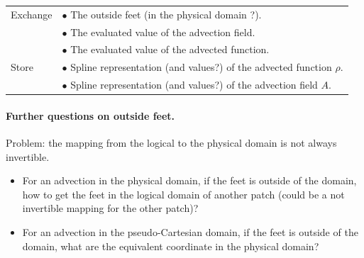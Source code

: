\documentclass[presentation.tex]{subfiles}
\begin{document}
\begin{center}
\begin{tabular}{ |l|l| } 
 \hline
 Exchange 	&  $\bullet$ The outside feet (in the physical domain ?). \\
 			&  $\bullet$ The evaluated value of the advection field. \\
 			&  $\bullet$ The evaluated value of the advected function. \\

 \hline
 Store 	& $\bullet$ Spline representation (and values?) of the advected function $\rho$. \\
 		& $\bullet$ Spline representation (and values?) of the advection field $A$. \\
 \hline
\end{tabular}
\end{center}

\paragraph{Further questions on outside feet.}
Problem: the mapping from the logical to the physical domain is not always invertible. 
\begin{itemize}
	\item For an advection in the physical domain, if the feet is outside of the domain, how to get the feet in the logical domain of another patch (could be a not invertible mapping for the other patch)?
	\item For an advection in the pseudo-Cartesian domain, if the feet is outside of the domain, what are the equivalent coordinate in the physical domain? 
\end{itemize}
\end{document}
